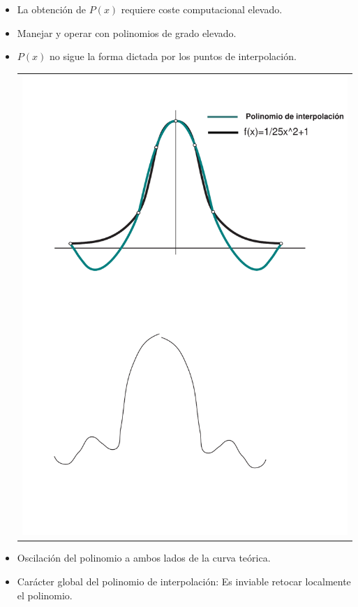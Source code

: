 \documentclass[ebook,oneside]{memoir}
\begin{document}
\begin{itemize}
\item La obtenci\'{o}n de $P(x)$ requiere coste computacional elevado.
\item Manejar y operar con polinomios de grado elevado.
\item $P(x)$ no sigue la forma dictada por los puntos de interpolaci\'{o}n.

\begin{tabular}{r}
        \includegraphics[scale=0.55]{forma.pdf}
\end{tabular}

\item Oscilaci\'{o}n del polinomio a ambos lados de la curva te\'{o}rica.

\item Car\'{a}cter global del polinomio de interpolaci\'{o}n: Es inviable retocar localmente el polinomio.


\end{itemize}
\end{document}
